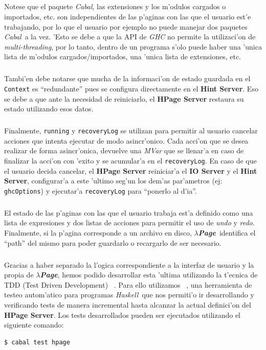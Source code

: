 \documentclass[a4paper]{article}
\newcommand{\haskell}{\textsl{Haskell}}
\newcommand{\hpage}{\textbf{\textsl{$\lambda$Page}}}
\newcommand{\cabal}{\textsl{Cabal}}
\begin{document}
\subparagraph{}Notese que el paquete \cabal, las extensiones y los m'odulos cargados o importados, etc. son independientes de las p'aginas con las que el usuario est'e trabajando, por lo que el usuario por ejemplo no puede manejar dos paquetes \cabal\ a la vez.  'Esto se debe a que la API de \textsl{GHC} no permite la utilizaci'on de \textsl{multi-threading}, por lo tanto, dentro de un programa s'olo puede haber una 'unica lista de m'odulos cargados/importados, una 'unica lista de extensiones, etc.
\subparagraph{}Tambi'en debe notarse que mucha de la informaci'on de estado guardada en el \texttt{Context} es ``redundante'' pues se configura directamente en el \textbf{Hint Server}.  Eso se debe a que ante la necesidad de reiniciarlo, el \textbf{HPage Server} restaura su estado utilizando esos datos.
\subparagraph{}Finalmente, \texttt{running} y \texttt{recoveryLog} se utilizan para permitir al usuario cancelar acciones que intenta ejecutar de modo asincr'onico.  Cada acci'on que se desea realizar de forma asincr'onica, devuelve una \textsl{MVar} que se llenar'a en caso de finalizar la acci'on con 'exito y se acumular'a en el \texttt{recoveryLog}.  En caso de que el usuario decida cancelar, el \textbf{HPage Server} reiniciar'a el \textbf{IO Server} y el \textbf{Hint Server}, configurar'a a este 'ultimo seg'un los dem'as par'ametros (ej: \texttt{ghcOptions}) y ejecutar'a \texttt{recoveryLog} para ``ponerlo al d'ia''.
\subparagraph{}El estado de las p'aginas con las que el usuario trabaja est'a definido como una lista de expresiones y dos listas de acciones para permitir el uso de \textsl{undo} y \textsl{redo}.  Finalmente, si la p'agina corresponde a un archivo en disco, \hpage\ identifica el ``path'' del mismo para poder guardarlo o recargarlo de ser necesario.
\subparagraph{}Gracias a haber separado la l'ogica correspondiente a la interfaz de usuario y la propia de \hpage, hemos podido desarrollar esta 'ultima utilizando la t'ecnica de TDD (Test Driven Development) ~\cite{tdd}.  Para ello utilizamos ~\cite{quickcheck}, una herramienta de testeo autom'atico para programas \haskell\ que nos permiti'o ir desarrollando y verificando tests de manera incremental hasta alcanzar la actual definici'on del \textbf{HPage Server}.  Los tests desarrollados pueden ser ejecutados utilizando el siguiente comando:
\lstset{language=sh, frame=single, tabsize=2}
\begin{center}\begin{lstlisting}
$ cabal test hpage
\end{lstlisting}\end{center}
\lstset{language=haskell, frame=single, tabsize=4}
\end{document}
